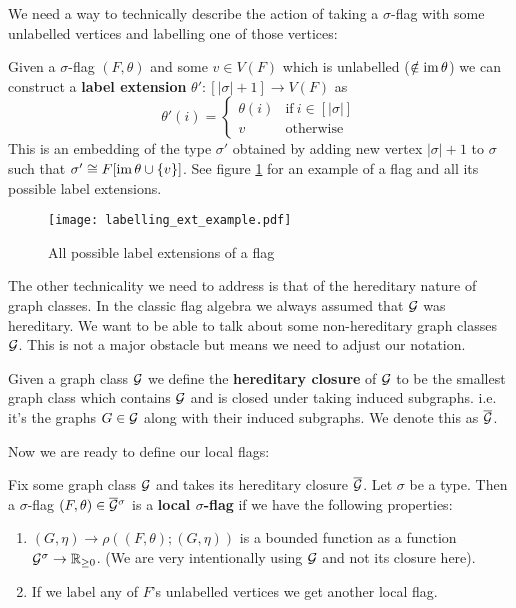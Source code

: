 We need a way to technically describe the action of taking a $\sigma$-flag with some
unlabelled vertices and labelling one of those vertices:

\begin{definition}
    Given a $\sigma$-flag $(F, \theta)$ and some $v\in V(F)$ which is unlabelled
    ($\notin\operatorname{im}\theta$) we can construct a \textbf{label extension}
    $\theta'\colon [|\sigma|+1] \to V(F)$ as
    \[
        \theta'(i) = \begin{cases}
            \theta(i) & \text{if}\ i\in[|\sigma|]\\
            v & \text{otherwise}
        \end{cases}
    \]
    This is an embedding of the type $\sigma'$ obtained by adding new vertex $|\sigma|+1$
    to $\sigma$ such that $\sigma' \cong F[\operatorname{im} \theta \cup \{v\}]$. See figure
    \ref{fig:labelling_ext_example} for an example of a flag and all its possible label
    extensions.
\end{definition}

\begin{figure}[ht]
    \centering
    \texttt{[image: labelling\_ext\_example.pdf]}
    \caption{All possible label extensions of a flag}
    \label{fig:labelling_ext_example}
\end{figure}

The other technicality we need to address is that of the hereditary nature of graph
classes. In the classic flag algebra we always assumed that $\mathcal{G}$ was hereditary. We want
to be able to talk about some non-hereditary graph classes $\mathcal{G}$. This is not a major
obstacle but means we need to adjust our notation.

\begin{definition}
    Given a graph class $\mathcal{G}$ we define the \textbf{hereditary closure} of $\mathcal{G}$ to be
    the smallest graph class which contains $\mathcal{G}$ and is closed under taking
    induced subgraphs. i.e. it's the graphs $G\in\mathcal{G}$ along with their induced subgraphs. We
    denote this as $\overline{\mathcal{G}}$.
\end{definition}

Now we are ready to define our local flags:

\begin{definition}
    \label{def:local_flag}
    Fix some graph class $\mathcal{G}$ and takes its hereditary closure $\overline{\mathcal{G}}$.
    Let $\sigma$ be a type. Then a $\sigma$-flag $(F, \theta)\in\overline{\mathcal{G}}{}^\sigma$ is a
    \textbf{local $\sigma$-flag} if we have the following properties:
    \begin{enumerate}
        \item $(G,\eta) \to \rho((F,\theta); (G,\eta))$ is a bounded function as a function
            $\mathcal{G}^\sigma\to\mathbb{R}_{\geq 0}$. (We are very intentionally using $\mathcal{G}$ and not its closure here).
        \item If we label any of $F$'s unlabelled vertices we get another local flag.
    \end{enumerate}
\end{definition}

